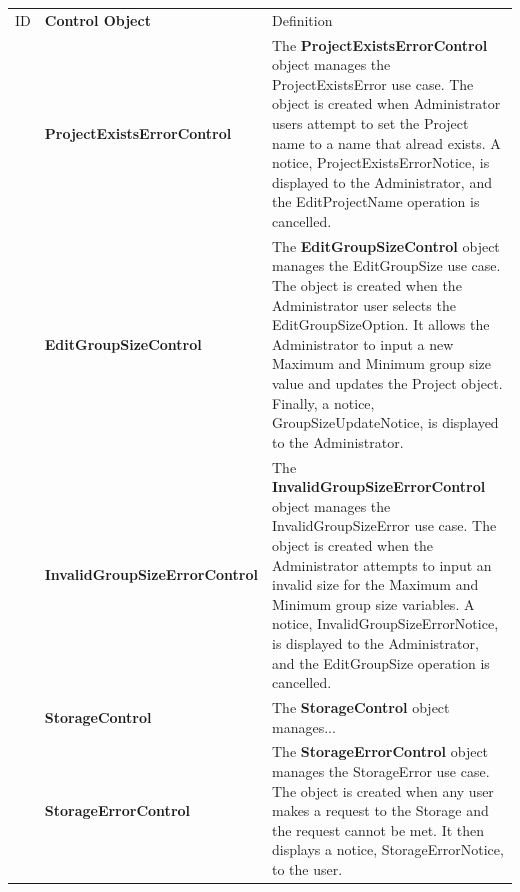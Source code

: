 \documentclass[12pt,letterpaper]{article}
\begin{document}
\begin{center}
\begin{tabu} to 
		\tableheader{}ID & Control Object & Definition\\
		 & Project\-Exists\-Error\-Control &
			The {\bf ProjectExistsErrorControl} object manages the ProjectExistsError use case. The object is created when Administrator users attempt to set 
			the Project name to a name that alread exists. A notice, ProjectExistsErrorNotice, is displayed to the Administrator, and the EditProjectName operation is cancelled.\\
		
		 & Edit\-Group\-Size\-Control & 
			The {\bf EditGroupSizeControl} object manages the EditGroupSize use case. The object is created when the Administrator user selects the EditGroupSizeOption. It allows the 
			Administrator to input a new Maximum and Minimum group size value and updates the Project object. Finally, a notice, GroupSizeUpdateNotice, is displayed to the Administrator.\\
		
		 & Invalid\-Group\-Size\-Error\-Control & 
			The {\bf InvalidGroupSizeErrorControl} object manages the InvalidGroupSizeError use case. The object is created when the Administrator attempts to input an invalid size for the Maximum
			and Minimum group size variables. A notice, InvalidGroupSizeErrorNotice, is displayed to the Administrator, and the EditGroupSize operation is cancelled. \\
		
		 & Storage\-Control & 
			The {\bf StorageControl} object manages...\\
		
		 & Storage\-Error\-Control & 
			The {\bf StorageErrorControl} object manages the StorageError use case. The object is created when any user makes a request to the Storage and the request cannot be met.
			It then displays a notice, StorageErrorNotice, to the user.\\
\end{tabu}
\end{center}
\end{document}
